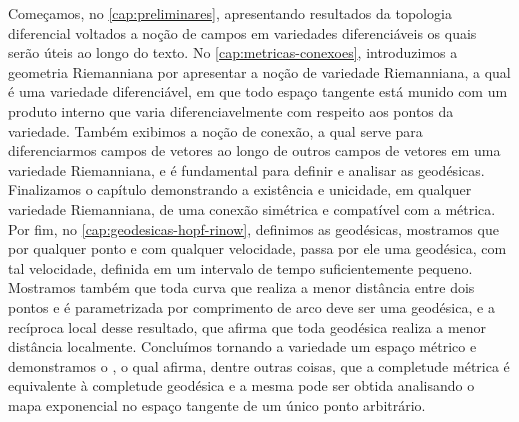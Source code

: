 Começamos, no \cref{cap:preliminares}, apresentando resultados da topologia diferencial voltados a noção de campos em variedades diferenciáveis os quais serão úteis ao longo do texto. No \cref{cap:metricas-conexoes}, introduzimos a geometria Riemanniana por apresentar a noção de variedade Riemanniana, a qual é uma variedade diferenciável, em que todo espaço tangente está munido com um produto interno que varia diferenciavelmente com respeito aos pontos da variedade. Também exibimos a noção de conexão, a qual serve para diferenciarmos campos de vetores ao longo de outros campos de vetores em uma variedade Riemanniana, e é fundamental para definir e analisar as geodésicas. Finalizamos o capítulo demonstrando a existência e unicidade, em qualquer variedade Riemanniana, de uma conexão simétrica e compatível com a métrica. Por fim, no \cref{cap:geodesicas-hopf-rinow}, definimos as geodésicas, mostramos que por qualquer ponto e com qualquer velocidade, passa por ele uma geodésica, com tal velocidade, definida em um intervalo de tempo suficientemente pequeno. Mostramos também que toda curva que realiza a menor distância entre dois pontos e é parametrizada por comprimento de arco deve ser uma geodésica, e a recíproca local desse resultado, que afirma que toda geodésica realiza a menor distância localmente. Concluímos tornando a variedade um espaço métrico e demonstramos o , o qual afirma, dentre outras coisas, que a completude métrica é equivalente à completude geodésica e a mesma pode ser obtida analisando o mapa exponencial no espaço tangente de um único ponto arbitrário.